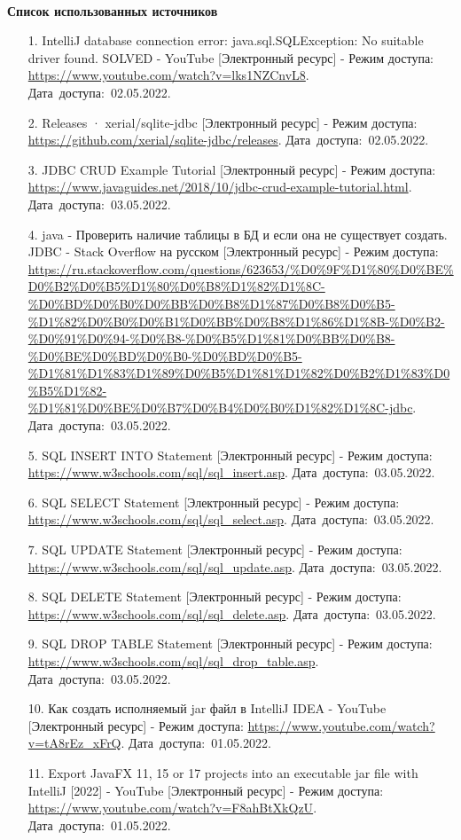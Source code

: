 \documentclass[12pt, a4paper, simple]{eskdtext}
\begin{document}
    \paragraph{} \textbf{Список использованных источников}
    \begin{enumerate}
        \item[1.] IntelliJ database connection error: java.sql.SQLException: No suitable driver found. SOLVED - YouTube [Электронный ресурс]
        - Режим доступа: \url{https://www.youtube.com/watch?v=lks1NZCnvL8}.
        Дата~доступа:~02.05.2022.
        \item[2.] Releases · xerial/sqlite-jdbc [Электронный ресурс]
        - Режим доступа: \url{https://github.com/xerial/sqlite-jdbc/releases}.
        Дата~доступа:~02.05.2022.
        \item[3.] JDBC CRUD Example Tutorial [Электронный ресурс]
        - Режим доступа: \url{https://www.javaguides.net/2018/10/jdbc-crud-example-tutorial.html}.
        Дата~доступа:~03.05.2022.
        \item[4.] java - Проверить наличие таблицы в БД и если она не существует создать. JDBC - Stack Overflow на русском [Электронный ресурс]
        - Режим доступа: \url{https://ru.stackoverflow.com/questions/623653/%D0%9F%D1%80%D0%BE%D0%B2%D0%B5%D1%80%D0%B8%D1%82%D1%8C-%D0%BD%D0%B0%D0%BB%D0%B8%D1%87%D0%B8%D0%B5-%D1%82%D0%B0%D0%B1%D0%BB%D0%B8%D1%86%D1%8B-%D0%B2-%D0%91%D0%94-%D0%B8-%D0%B5%D1%81%D0%BB%D0%B8-%D0%BE%D0%BD%D0%B0-%D0%BD%D0%B5-%D1%81%D1%83%D1%89%D0%B5%D1%81%D1%82%D0%B2%D1%83%D0%B5%D1%82-%D1%81%D0%BE%D0%B7%D0%B4%D0%B0%D1%82%D1%8C-jdbc}.
        Дата~доступа:~03.05.2022.
        \item[5.] SQL INSERT INTO Statement [Электронный ресурс]
        - Режим доступа: \url{https://www.w3schools.com/sql/sql_insert.asp}.
        Дата~доступа:~03.05.2022.
        \item[6.] SQL SELECT Statement [Электронный ресурс]
        - Режим доступа: \url{https://www.w3schools.com/sql/sql_select.asp}.
        Дата~доступа:~03.05.2022.
        \item[7.] SQL UPDATE Statement [Электронный ресурс]
        - Режим доступа: \url{https://www.w3schools.com/sql/sql_update.asp}.
        Дата~доступа:~03.05.2022.
        \item[8.] SQL DELETE Statement [Электронный ресурс]
        - Режим доступа: \url{https://www.w3schools.com/sql/sql_delete.asp}.
        Дата~доступа:~03.05.2022.
        \item[9.] SQL DROP TABLE Statement [Электронный ресурс]
        - Режим доступа: \url{https://www.w3schools.com/sql/sql_drop_table.asp}.
        Дата~доступа:~03.05.2022.
        \item[10.] Как создать исполняемый jar файл в IntelliJ IDEA - YouTube [Электронный ресурс]
        - Режим доступа: \url{https://www.youtube.com/watch?v=tA8rEz_xFrQ}.
        Дата~доступа:~01.05.2022.
        \item[11.] Export JavaFX 11, 15 or 17 projects into an executable jar file with IntelliJ [2022] - YouTube [Электронный ресурс]
        - Режим доступа: \url{https://www.youtube.com/watch?v=F8ahBtXkQzU}.
        Дата~доступа:~01.05.2022.
    \end{enumerate}
    \newpage
\end{document}
